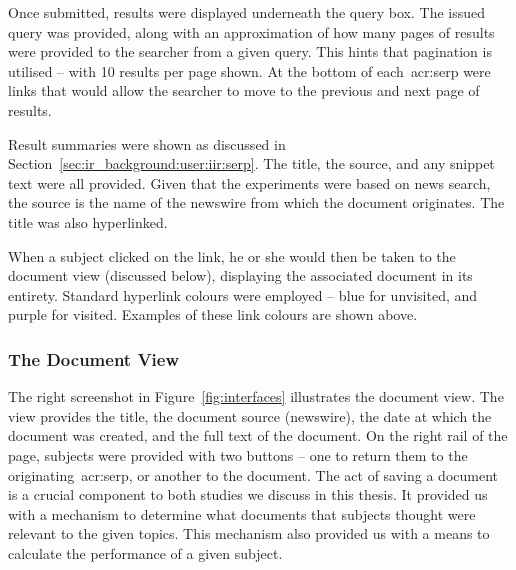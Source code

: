 Once submitted, results were displayed underneath the query box. The issued query was provided, along with an approximation of how many pages of results were provided to the searcher from a given query. This hints that pagination is utilised -- with 10 results per page shown. At the bottom of each~\gls{acr:serp} were links that would allow the searcher to move to the previous and next page of results.

\begin{figure}[h]
    \centering
    \vspace{4mm}
    \label{fig:serp_buttons}
    \vspace{-5mm}
\end{figure}

Result summaries were shown as discussed in Section~\ref{sec:ir_background:user:iir:serp}. The title, the source, and any snippet text were all provided. Given that the experiments were based on news search, the source is the name of the newswire from which the document originates. The title was also hyperlinked.

\begin{figure}[h]
    \centering
    \vspace{2mm}
    \label{fig:serp_links}
    \vspace{-10mm}
\end{figure}

When a subject clicked on the link, he or she would then be taken to the document view (discussed below), displaying the associated document in its entirety. Standard hyperlink colours were employed -- blue for unvisited, and purple for visited. Examples of these link colours are shown above.

\subsubsection{The Document View}\label{sec:methodology:user:interface:document}
The right screenshot in Figure~\ref{fig:interfaces} illustrates the document view. The view provides the title, the document source (newswire), the date at which the document was created, and the full text of the document. On the right rail of the page, subjects were provided with two buttons -- one to return them to the originating~\gls{acr:serp}, or another to  the document. The act of saving a document is a crucial component to both studies we discuss in this thesis. It provided us with a mechanism to determine what documents that subjects thought were relevant to the given topics. This mechanism also provided us with a means to calculate the performance of a given subject.

